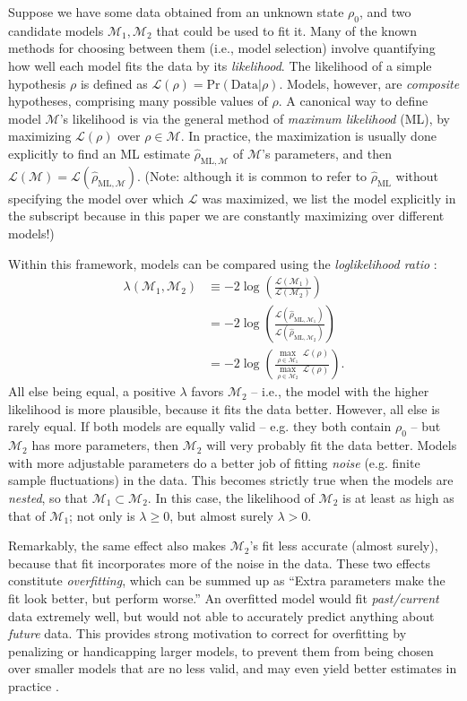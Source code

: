 \documentclass[aps,pra, twocolumn]{revtex4-1}
\newcommand{\M}{\mathcal{M}}
\newcommand{\cL}{\mathcal{L}}
\newcommand{\rhohat}{\hat{\rho}}
\newcommand{\rhoML}[1]{\rhohat_{\scriptscriptstyle{\mathrm{ML},#1}}}
\begin{document}
Suppose we have some data obtained from an unknown state $\rho_{0}$, and two candidate models $\M_{1}, \M_{2}$ that could be used to fit it.  Many of the known methods for choosing between them (i.e., model selection) involve quantifying how well each model fits the data by its \emph{likelihood}.  The likelihood of a simple hypothesis $\rho$ is defined as $\mathcal{L}(\rho) = \mathrm{Pr}(\mathrm{Data}|\rho)$.  Models, however, are \emph{composite} hypotheses, comprising many possible values of $\rho$.  A canonical way to define model $\M$'s likelihood is via the general method of \emph{maximum likelihood} (ML), by maximizing $\cL(\rho)$ over $\rho\in\M$.  In practice, the maximization is usually done explicitly to find an ML estimate $\hat{\rho}_{\mathrm{ML},\M}$ \cite{Hradil1997, JamesPRA2001, Blume-Kohout2010} of $\M$'s parameters, and then $\cL(\M) = \cL(\hat{\rho}_{\mathrm{ML},\M})$.  (Note: although it is common to refer to $\hat\rho_{\mathrm{ML}}$ without specifying the model over which $\cL$ was maximized, we list the model explicitly in the subscript because in this paper we are constantly maximizing over different models!)

Within this framework, models can be compared using the \emph{loglikelihood ratio} \cite{Neyman1933, Blume-Kohout2010, Moroder2013}:
\begin{align}
\lambda(\M_{1}, \M_{2}) &\equiv -2 \log \left(\frac{\cL(\M_{1})}{\cL(\M_{2})}\right)\\
&= -2 \log \left(\frac{\cL(\rhoML{\M_{1}})}{\cL(\rhoML{\M_{2}})}\right)\\
&= -2 \log \left(\frac{\underset{\rho \in \M_{1}}{\max}~\cL(\rho)}{\underset{\rho \in \M_{2}}{\max}~\cL(\rho)}\right).
\end{align}
All else being equal, a positive $\lambda$ favors $\M_2$ -- i.e., the model with the higher likelihood is more plausible, because it fits the data better.  However, all else is rarely equal.  If both models are equally valid -- e.g. they both contain $\rho_0$ -- but $\M_2$ has more parameters, then $\M_2$ will very probably fit the data better.  Models with more adjustable parameters do a better job of fitting \emph{noise} (e.g. finite sample fluctuations) in the data.  This becomes strictly true when the models are \emph{nested}, so that $\M_{1} \subset \M_{2}$.  In this case, the likelihood of $\M_{2}$ is at least as high as that of $\M_{1}$;  not only is $\lambda \geq 0$, but almost surely $\lambda > 0$.

Remarkably, the same effect also makes $\M_{2}$'s fit less accurate (almost surely), because that fit incorporates more of the noise in the data.  These two effects constitute \emph{overfitting}, which can be summed up as ``Extra parameters make the fit look better, but perform worse.''  An overfitted model would fit \emph{past/current} data extremely well,  but would not able to accurately predict anything about \emph{future} data. This provides strong motivation to correct for overfitting by penalizing or handicapping larger models, to prevent them from being chosen over smaller models that are no less valid, and may even yield better estimates in practice \cite{Akaike1974}.
\end{document}
